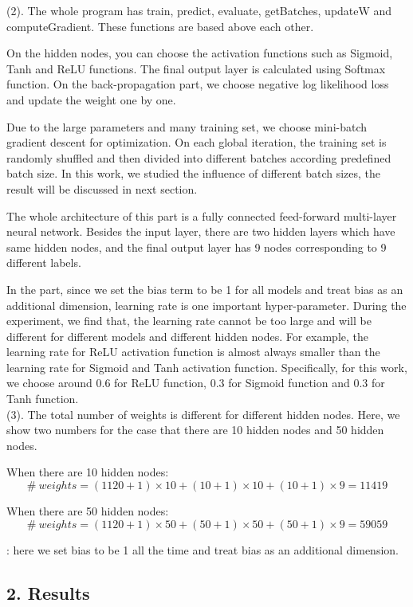 (2). The whole program has train, predict, evaluate, getBatches, updateW and computeGradient. These functions are based above each other.

On the hidden nodes, you can choose the activation functions such as Sigmoid, Tanh and ReLU functions. The final output layer is calculated using Softmax function. On the back-propagation part, we choose negative log likelihood loss and update the weight one by one.

Due to the large parameters and many training set, we choose mini-batch gradient descent for optimization. On each global iteration, the training set is randomly shuffled and then divided into different batches according predefined batch size. In this work, we studied the influence of different batch sizes, the result will be discussed in next section.

The whole architecture of this part is a fully connected feed-forward multi-layer neural network. Besides the input layer, there are two hidden layers which have same hidden nodes, and the final output layer has 9 nodes corresponding to 9 different labels. 

In the part, since we set the bias term to be 1 for all models and treat bias as an additional dimension, learning rate is one important hyper-parameter. During the experiment, we find that, the learning rate cannot be too large and will be different for different models and different hidden nodes. For example, the learning rate for ReLU activation function is almost always smaller than the learning rate for Sigmoid and Tanh activation function. Specifically, for this work, we choose around 0.6 for ReLU function, 0.3 for Sigmoid function and 0.3 for Tanh function.\\

(3). The total number of weights is different for different hidden nodes. Here, we show two numbers for the case that there are 10 hidden nodes and 50 hidden nodes.

When there are 10 hidden nodes:
$$ \# \  weights = (1120 + 1) \times 10 + (10 + 1) \times 10 + (10 + 1) \times 9 = 11419 $$

When there are 50 hidden nodes:
$$ \# \  weights = (1120 + 1) \times 50 + (50 + 1) \times 50 + (50 + 1) \times 9 = 59059 $$

: here we set bias to be 1 all the time and treat bias as an additional dimension.


\subsection*{\large 2. Results}

